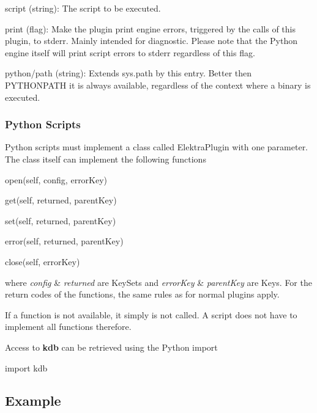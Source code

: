 \begin{DoxyItemize}
\item {\ttfamily script} (string)\+: The script to be executed.
\item {\ttfamily print} (flag)\+: Make the plugin print engine errors, triggered by the calls of this plugin, to stderr. Mainly intended for diagnostic. Please note that the Python engine itself will print script errors to stderr regardless of this flag.
\item {\ttfamily python/path} (string)\+: Extends sys.\+path by this entry. Better then P\+Y\+T\+H\+O\+N\+P\+A\+TH it is always available, regardless of the context where a binary is executed.
\end{DoxyItemize}

\subsubsection*{Python Scripts}

Python scripts must implement a class called {\ttfamily Elektra\+Plugin} with one parameter. The class itself can implement the following functions


\begin{DoxyItemize}
\item open(self, config, error\+Key)
\item get(self, returned, parent\+Key)
\item set(self, returned, parent\+Key)
\item error(self, returned, parent\+Key)
\item close(self, error\+Key)
\end{DoxyItemize}

where {\itshape config} \& {\itshape returned} are Key\+Sets and {\itshape error\+Key} \& {\itshape parent\+Key} are Keys. For the return codes of the functions, the same rules as for normal plugins apply.

If a function is not available, it simply is not called. A script does not have to implement all functions therefore.

Access to {\bfseries kdb} can be retrieved using the Python import \begin{DoxyVerb}import kdb
\end{DoxyVerb}


\subsection*{Example}

